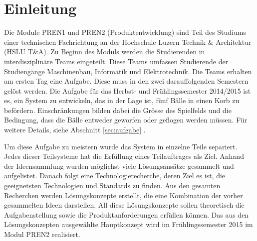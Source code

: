 \section{Einleitung}
Die Module PREN1 und PREN2 (Produktentwicklung) sind Teil des Studiums einer 
technischen Fachrichtung an der Hochschule Luzern Technik \& Architektur 
(HSLU T\&A). 
Zu Beginn des Moduls werden die Studierenden in interdisziplinäre Teams 
eingeteilt. Diese Teams umfassen Studierende der Studiengänge Maschinenbau, 
Informatik und Elektrotechnik. Die Teams erhalten am ersten Tag eine Aufgabe. 
Diese muss in den zwei darauffolgenden Semestern gelöst werden. 
Die Aufgabe für das Herbst- und Frühlingssemester 2014/2015 ist es, ein System 
zu entwickeln, das in der Lage ist, fünf Bälle in einen Korb zu befördern. 
Einschränkungen bilden dabei die Grösse des Spielfelds und die Bedingung, dass 
die Bälle entweder geworfen oder geflogen werden müssen. 
Für weitere Details, siehe Abschnitt \ref{sec:aufgabe} . 

\noindent Um diese Aufgabe zu meistern wurde das System in einzelne Teile 
separiert. Jedes dieser Teilsysteme hat die Erfüllung eines Teilauftrages als 
Ziel. Anhand der Ideensammlung wurden möglichst viele Lösungsansätze gesammelt 
und aufgelistet. Danach folgt eine Technologierecherche, deren Ziel es ist, 
die geeignetsten Technologien und Standards zu finden. Aus den gesamten 
Recherchen werden Lösungskonzepte erstellt, die eine Kombination der vorher 
gesammelten Ideen darstellen. All diese Lösungskonzepte sollen theoretisch die 
Aufgabenstellung sowie die Produktanforderungen erfüllen können. Das aus den 
Lösungskonzepten ausgewählte Hauptkonzept wird im Frühlingssemester 2015 im 
Modul PREN2 realisiert.

